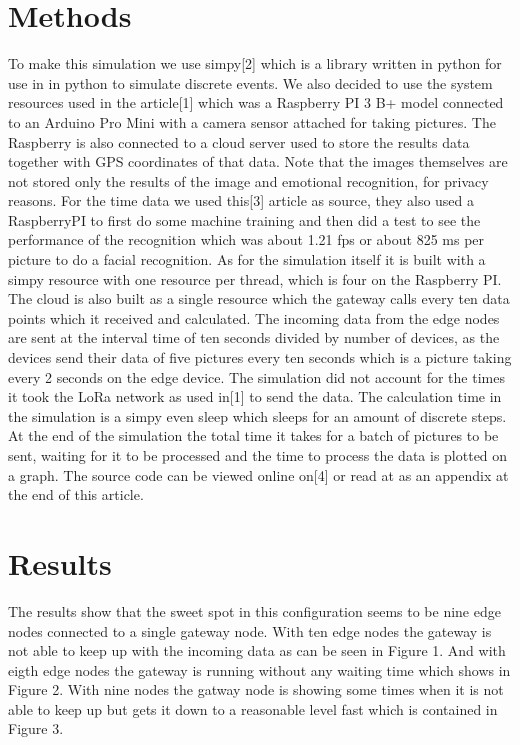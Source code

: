 \documentclass[a4paper,11pt,notitlepage,twocolumn]{article}
\begin{document}
  \section{Methods}
    To make this simulation we use simpy[2] which is a library written in python for use in
    in python to simulate discrete events. We also decided to use the system resources used
    in the article[1] which was a Raspberry PI 3 B+ model connected to an Arduino Pro Mini
    with a camera sensor attached for taking pictures. The Raspberry is also connected to a
    cloud server used to store the results data together with GPS coordinates of that data.
    Note that the images themselves are not stored only the results of the image and
    emotional recognition, for privacy reasons. For the time data we used this[3] article as
    source, they also used a RaspberryPI to first do some machine training and then did a test
    to see the performance of the recognition which was about 1.21 fps or about 825 ms per
    picture to do a facial recognition. As for the simulation itself it is built with a 
    simpy resource with one resource per thread, which is four on the Raspberry PI. The
    cloud is also built as a single resource which the gateway calls every ten data points
    which it received and calculated. The incoming data from the edge nodes are sent at the
    interval time of ten seconds divided by number of devices, as the devices send their data
    of five pictures every ten seconds which is a picture taking every 2 seconds on the edge
    device. The simulation did not account for the times it took the LoRa network as used in[1]
    to send the data. The calculation time in the simulation is a simpy even sleep which sleeps
    for an amount of discrete steps. At the end of the simulation the total time it takes for
    a batch of pictures to be sent, waiting for it to be processed and the time to process
    the data is plotted on a graph. The source code can be viewed online on[4] or read at
    as an appendix at the end of this article.
  
  \section{Results}
    The results show that the sweet spot in this configuration seems to be nine edge nodes
    connected to a single gateway node. With ten edge nodes the gateway is not able to keep
    up with the incoming data as can be seen in Figure 1. And with eigth edge nodes the gateway is running without any
    waiting time which shows in Figure 2. With nine nodes the gatway node is showing some times when it is not able
    to keep up but gets it down to a reasonable level fast which is contained in Figure 3. 
    
\end{document}
